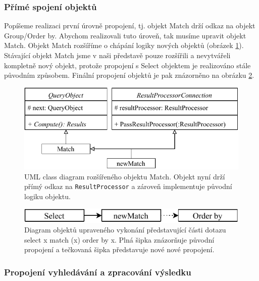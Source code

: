 \subsubsection{Přímé spojení objektů} \label{anal.improvement.con1}

Popíšeme realizaci první úrovně propojení, tj. objekt Match drží odkaz na objekt Group/Order by.
Abychom realizovali tuto úroveň, tak musíme upravit objekt Match.
Objekt Match rozšíříme o chápání logiky nových objektů (obrázek \ref{figure.diaStreamedQueryObjects}).
Stávající objekt Match jsme v naši představě pouze rozšířili a nevytvářeli kompletně nový objekt, protože propojení s Select objektem je realizováno stále původním způsobem.
Finální propojení objektů je pak znázorněno na obrázku \ref{figure.diaStreamedQueryObjectsCon}.

\begin{figure}[!htp]
\includegraphics{../img/diaStreamedQueryObjects.pdf}\centering
\caption{UML class diagram rozšířeného objektu Match. Objekt nyní drží přímý odkaz na \texttt{ResultProcessor} a zároveň implementuje původní logiku objektu.}
\label{figure.diaStreamedQueryObjects}
\end{figure}

\begin{figure}[!htp]
\includegraphics{../img/diaStreamedQueryObjectsCon.pdf}\centering
\caption{Diagram objektů upraveného vykonání představující části dotazu select x match (x) order by x. Plná šipka znázorňuje původní propojení a tečkovaná šipka představuje nové nové propojení.}
\label{figure.diaStreamedQueryObjectsCon}
\end{figure}


\subsubsection{Propojení vyhledávání a zpracování výsledku} \label{anal.improvement.con2}

